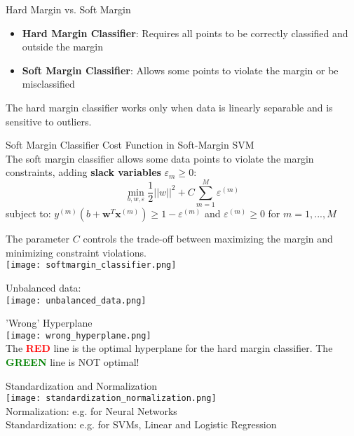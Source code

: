 \begin{concept}{Hard Margin vs. Soft Margin}
\begin{itemize}
    \item \textbf{Hard Margin Classifier}: Requires all points to be correctly classified and outside the margin
    \item \textbf{Soft Margin Classifier}: Allows some points to violate the margin or be misclassified
\end{itemize}
The hard margin classifier works only when data is linearly separable and is sensitive to outliers.
\end{concept}

\begin{definition}{Soft Margin Classifier} Cost Function in Soft-Margin SVM\\
The soft margin classifier allows some data points to violate the margin constraints, adding \textbf{slack variables} $\varepsilon_m \geq 0$:
\[\min_{b,w,\varepsilon} \frac{1}{2}||w||^2 + C\sum_{m=1}^{M}\varepsilon^{(m)}\]
subject to: $y^{(m)}(b + \mathbf{w}^T \mathbf{x}^{(m)}) \geq 1 - \varepsilon^{(m)}$ and $\varepsilon^{(m)} \geq 0$ for $m = 1,..., M$

The parameter $C$ controls the trade-off between maximizing the margin and minimizing constraint violations.\\
\texttt{[image: softmargin\_classifier.png]}
\end{definition}

\begin{remark}
    Unbalanced data:\\
    \texttt{[image: unbalanced\_data.png]}
\end{remark}

\begin{example2}{'Wrong' Hyperplane}\\
    \texttt{[image: wrong\_hyperplane.png]}\\
    The \textcolor{red}{\textbf{RED}} line is the optimal hyperplane for the hard margin classifier. The \textcolor{green}{\textbf{GREEN}} line is NOT optimal!
\end{example2}

\begin{definition}{Standardization and Normalization}\\
    \texttt{[image: standardization\_normalization.png]}\\
    \small Normalization: e.g. for Neural Networks\\
    \small Standardization: e.g. for SVMs, Linear and Logistic Regression    
\end{definition}

